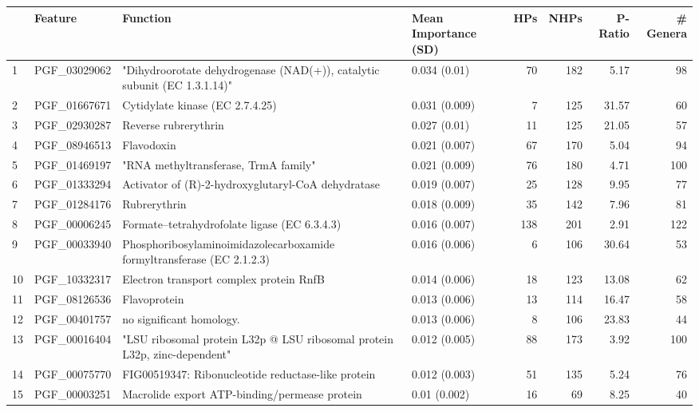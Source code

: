 \begin{tabular}{llllrrrr}
\toprule
{} &       Feature &                                                                   Function & Mean Importance (SD) &  HPs &  NHPs &  P-Ratio &  \# Genera \\
\midrule
1  &  PGF\_03029062 &   "Dihydroorotate dehydrogenase (NAD(+)), catalytic subunit (EC 1.3.1.14)" &         0.034 (0.01) &   70 &   182 &     5.17 &        98 \\
2  &  PGF\_01667671 &                                            Cytidylate kinase (EC 2.7.4.25) &        0.031 (0.009) &    7 &   125 &    31.57 &        60 \\
3  &  PGF\_02930287 &                                                       Reverse rubrerythrin &         0.027 (0.01) &   11 &   125 &    21.05 &        57 \\
4  &  PGF\_08946513 &                                                                 Flavodoxin &        0.021 (0.007) &   67 &   170 &     5.04 &        94 \\
5  &  PGF\_01469197 &                                       "RNA methyltransferase, TrmA family" &        0.021 (0.009) &   76 &   180 &     4.71 &       100 \\
6  &  PGF\_01333294 &                         Activator of (R)-2-hydroxyglutaryl-CoA dehydratase &        0.019 (0.007) &   25 &   128 &     9.95 &        77 \\
7  &  PGF\_01284176 &                                                               Rubrerythrin &        0.018 (0.009) &   35 &   142 &     7.96 &        81 \\
8  &  PGF\_00006245 &                              Formate--tetrahydrofolate ligase (EC 6.3.4.3) &        0.016 (0.007) &  138 &   201 &     2.91 &       122 \\
9  &  PGF\_00033940 &     Phosphoribosylaminoimidazolecarboxamide formyltransferase (EC 2.1.2.3) &        0.016 (0.006) &    6 &   106 &    30.64 &        53 \\
10 &  PGF\_10332317 &                                    Electron transport complex protein RnfB &        0.014 (0.006) &   18 &   123 &    13.08 &        62 \\
11 &  PGF\_08126536 &                                                               Flavoprotein &        0.013 (0.006) &   13 &   114 &    16.47 &        58 \\
12 &  PGF\_00401757 &                                                   no significant homology. &        0.013 (0.006) &    8 &   106 &    23.83 &        44 \\
13 &  PGF\_00016404 &  "LSU ribosomal protein L32p @ LSU ribosomal protein L32p, zinc-dependent" &        0.012 (0.005) &   88 &   173 &     3.92 &       100 \\
14 &  PGF\_00075770 &                         FIG00519347: Ribonucleotide reductase-like protein &        0.012 (0.003) &   51 &   135 &     5.24 &        76 \\
15 &  PGF\_00003251 &                              Macrolide export ATP-binding/permease protein &         0.01 (0.002) &   16 &    69 &     8.25 &        40 \\
\bottomrule
\end{tabular}
